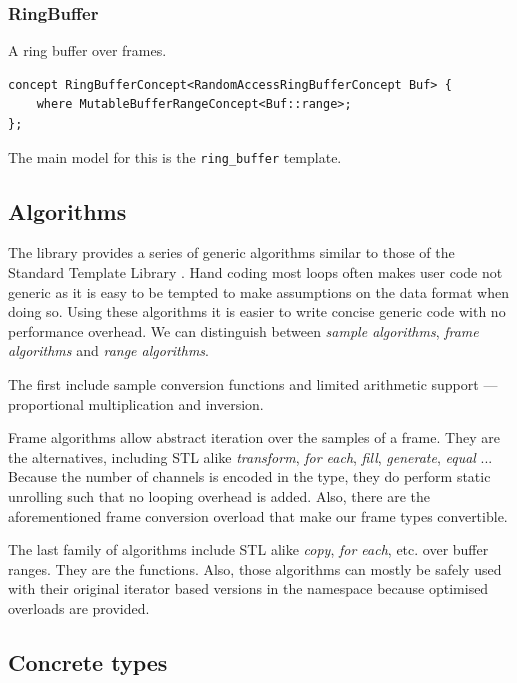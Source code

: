\subsubsection{RingBuffer}

A ring buffer over frames.

\begin{lstlisting}
concept RingBufferConcept<RandomAccessRingBufferConcept Buf> {
    where MutableBufferRangeConcept<Buf::range>;
};
\end{lstlisting}

The main model for this is the \texttt{ring\_buffer} template.

\subsection{Algorithms}

The library provides a series of generic algorithms similar to those
of the Standard Template Library \cite{stepanov94stl}. Hand coding
most loops often makes user code not generic as it is easy to be
tempted to make assumptions on the data format when doing so. Using
these algorithms it is easier to write concise generic code with no
performance overhead.  We can distinguish between \emph{sample
  algorithms}, \emph{frame algorithms} and \emph{range algorithms}.

The first include sample conversion functions and limited arithmetic
support --- proportional multiplication and inversion.

Frame algorithms allow abstract iteration over the samples of a
frame. They are the  alternatives, including STL alike
\emph{transform}, \emph{for each}, \emph{fill}, \emph{generate},
\emph{equal} ... Because the number of channels is encoded in the
type, they do perform static unrolling such that no looping overhead
is added. Also, there are the aforementioned frame conversion
overload that make our frame types convertible.

The last family of algorithms include STL alike \emph{copy}, \emph{for
each}, etc. over buffer ranges. They are the 
functions. Also, those algorithms can mostly be safely used with their
original iterator based versions in the  namespace because
optimised overloads are provided.

\subsection{Concrete types}

